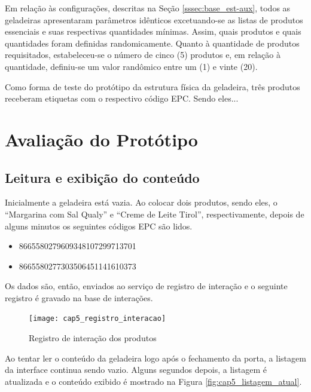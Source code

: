Em relação às configurações, descritas na Seção \ref{sssec:base_est-aux}, todos as geladeiras apresentaram parâmetros idênticos excetuando-se as listas de produtos essenciais e suas respectivas quantidades mínimas. Assim, quais produtos e quais quantidades foram definidas randomicamente. Quanto à quantidade de produtos requisitados, estabeleceu-se o número de cinco (5) produtos e, em relação à quantidade, definiu-se um valor randômico entre um (1) e vinte (20).

Como forma de teste do protótipo da estrutura física da geladeira, três produtos receberam etiquetas com o respectivo código EPC. Sendo eles...


\section{Avaliação do Protótipo}

\subsection{Leitura e exibição do conteúdo}
 Inicialmente a geladeira está vazia.
 Ao colocar dois produtos, sendo eles, o ``Margarina com Sal Qualy'' e ``Creme de Leite Tirol'', respectivamente, depois de alguns minutos os seguintes códigos EPC são lidos.
 
 \begin{itemize} \parskip -3pt
     \item 8665580279609348107299713701
     \item 8665580277303506451141610373
 \end{itemize}
 
 Os dados são, então, enviados ao serviço de registro de interação e o seguinte registro é gravado na base de interações. 
 
 \begin{figure}[htb]
     \caption{Registro de interação dos produtos}
     \label{fig:cap5_registro_interacao}
     \texttt{[image: cap5\_registro\_interacao]}
 \end{figure}
 
 
Ao tentar ler o conteúdo da geladeira logo após o fechamento da porta, a listagem da interface continua sendo vazio. Alguns segundos depois, a listagem é atualizada e o conteúdo exibido é mostrado na Figura \ref{fig:cap5_listagem_atual}.

